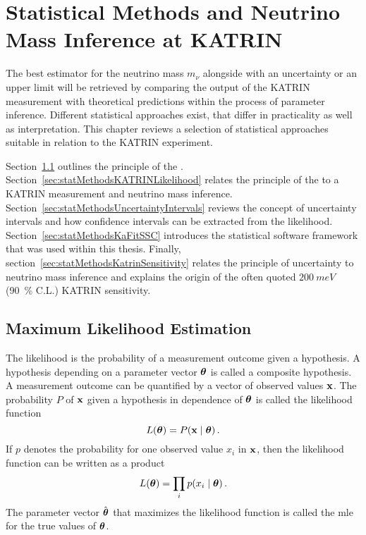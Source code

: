\def\currentRootFolder{chapter/statisticalMethods}
\def\currentFigureFolder{\currentRootFolder/fig}


\chapter{Statistical Methods and Neutrino Mass Inference at KATRIN}
\label{sec:statMethods}
The best estimator for the neutrino mass $m_\nu$ alongside with an uncertainty or an upper limit will be retrieved by comparing the output of the KATRIN measurement with theoretical predictions within the process of parameter inference. Different statistical approaches exist, that differ in practicality as well as interpretation. This chapter reviews a selection of statistical approaches suitable in relation to the KATRIN experiment.

Section~\ref{sec:statMethodsMLE} outlines the principle of the . Section~\ref{sec:statMethodsKATRINLikelihood} relates the principle of the  to a KATRIN measurement and neutrino mass inference. Section~\ref{sec:statMethodsUncertaintyIntervals} reviews the concept of uncertainty intervals and how confidence intervals can be extracted from the likelihood. Section~\ref{sec:statMethodsKaFitSSC} introduces the statistical software framework that was used within this thesis. Finally, section~\ref{sec:statMethodsKatrinSensitivity} relates the principle of uncertainty to neutrino mass inference and explains the origin of the often quoted $\SI{200}{meV}$ (\SI{90}{\percent} C.L.) KATRIN sensitivity.

\section{Maximum Likelihood Estimation}
\label{sec:statMethodsMLE}
The likelihood is the probability of a measurement outcome given a hypothesis. A hypothesis depending on a parameter vector $\boldsymbol{\mathbf{\theta}}$ is called a composite hypothesis. A measurement outcome can be quantified by a vector of observed values $\boldsymbol{\mathbf{x}}$. The probability $P$ of $\boldsymbol{\mathbf{x}}$ given a hypothesis in dependence of $\boldsymbol{\mathbf{\theta}}$ is called the likelihood function~\cite{ReviewOfParticlePhysics}
\begin{equation}
	L(\paramVec) = P\giventhat{\dataVec}{\paramVec}
	\fullstop
\end{equation}
If $p$ denotes the probability for one observed value $x_i$ in $\boldsymbol{\mathbf{x}}$, then the likelihood function can be written as a product~\cite{ReviewOfParticlePhysics}
\begin{equation}
	L(\paramVec) = \prod_{i} p\giventhat{x_i}{\paramVec}
	\fullstop
\end{equation}
The parameter vector $\hat{\boldsymbol{\mathbf{\theta}}}$ that maximizes the likelihood function is called the \gls{mle} for the true values of $\boldsymbol{\mathbf{\theta}}$.

